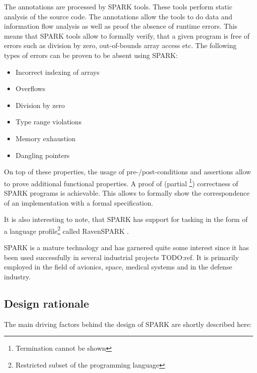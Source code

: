 The annotations are processed by SPARK tools. These tools perform static
analysis of the source code. The annotations allow the tools to do data and
information flow analysis as well as proof the absence of runtime errors. This
means that SPARK tools allow to formally verify, that a given program is free
of errors such as division by zero, out-of-bounds array access etc. The
following types of errors can be proven to be absent using SPARK:

\begin{itemize}
	\item Incorrect indexing of arrays
	\item Overflows
	\item Division by zero
	\item Type range violations
	\item Memory exhaustion
	\item Dangling pointers
\end{itemize}

On top of these properties, the usage of pre-/post-conditions and assertions
allow to prove additional functional properties. A proof of (partial
\footnote{Termination cannot be shown}) correctness of SPARK programs is
achievable. This allows to formally show the correspondence of an implementation
with a formal specification.

It is also interesting to note, that SPARK has support for tasking in the form
of a language profile\footnote{Restricted subset of the programming language}
called RavenSPARK \cite{RavenSPARK}.

SPARK is a mature technology and has garnered quite some interest since it has
been used successfully in several industrial projects TODO:ref. It is primarily
employed in the field of avionics, space, medical systems and in the defense
industry.

\subsection{Design rationale}
The main driving factors behind the design of SPARK are shortly described here:

